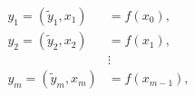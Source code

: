\begin{align}
y_{1}=\left(\tilde{y}_{1},x_{1}\right) & =f\left(x_{0}\right),\nonumber \\
y_{2}=\left(\tilde{y}_{2},x_{2}\right) & =f\left(x_{1}\right),\nonumber \\
 & \vdots\label{eq:chain}\\
y_{m}=\left(\tilde{y}_{m},x_{m}\right) & =f\left(x_{m-1}\right),\nonumber
\end{align}
